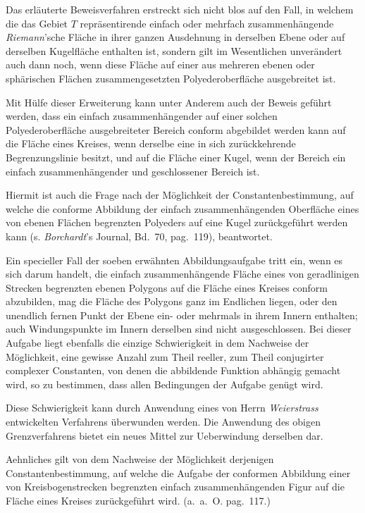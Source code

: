 \documentclass{article}
\begin{document}
Das erläuterte Beweisverfahren erstreckt sich nicht blos auf den Fall, in welchem die das Gebiet $T$ repräsentirende einfach oder mehrfach zusammenhängende \emph{Riemann}'sche Fläche in ihrer ganzen Ausdehnung in derselben Ebene oder auf derselben Kugelfläche enthalten ist, sondern gilt im Wesentlichen unverändert auch dann noch, wenn diese Fläche auf einer aus mehreren ebenen oder sphärischen Flächen zusammengesetzten Polyederoberfläche ausgebreitet ist.

Mit Hülfe dieser Erweiterung kann unter Anderem auch der Beweis geführt werden, dass ein einfach zusammenhängender auf einer solchen Polyederoberfläche ausgebreiteter Bereich conform abgebildet
werden kann auf die Fläche eines Kreises, wenn derselbe eine in sich zurückkehrende Begrenzungslinie besitzt, und auf die Fläche einer Kugel, wenn der Bereich ein einfach zusammenhängender und geschlossener Bereich ist.

Hiermit ist auch die Frage nach der Möglichkeit der Constantenbestimmung, auf welche die conforme Abbildung der einfach zusammenhängenden Oberfläche eines von ebenen Flächen begrenzten Polyeders auf eine Kugel zurückgeführt werden kann (s. \emph{Borchardt}'s Journal, Bd.~70, pag.~119), beantwortet.

Ein specieller Fall der soeben erwähnten Abbildungsaufgabe tritt ein, wenn es sich darum handelt, die einfach zusammenhängende Fläche eines von geradlinigen Strecken begrenzten ebenen Polygons auf die Fläche eines Kreises conform abzubilden, mag die Fläche des Polygons ganz im Endlichen liegen, oder den unendlich fernen Punkt der Ebene ein- oder mehrmals in ihrem Innern enthalten; auch Windungspunkte im Innern derselben sind nicht ausgeschlossen. Bei dieser Aufgabe liegt ebenfalls die einzige Schwierigkeit in dem Nachweise der Möglichkeit, eine gewisse Anzahl zum Theil reeller, zum Theil conjugirter complexer Constanten, von denen die abbildende Funktion abhängig gemacht wird, so zu bestimmen, dass allen Bedingungen der Aufgabe genügt wird.

Diese Schwierigkeit kann durch Anwendung eines von Herrn \emph{Weierstrass} entwickelten Verfahrens überwunden werden. Die Anwendung des obigen Grenzverfahrens bietet ein neues Mittel zur Ueberwindung derselben dar.

Aehnliches gilt von dem Nachweise der
Möglichkeit derjenigen Constantenbestimmung, auf welche die Aufgabe der conformen Abbildung einer von Kreisbogenstrecken begrenzten einfach zusammenhängenden Figur auf die Fläche eines Kreises zurückgeführt wird. (a.~a.~O. pag.~117.)
\end{document}
